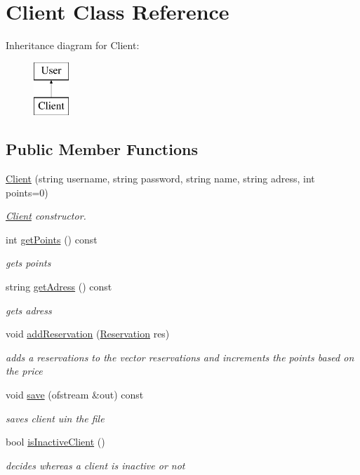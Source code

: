 \hypertarget{class_client}{}\section{Client Class Reference}
\label{class_client}
Inheritance diagram for Client\+:\begin{figure}[H]
\begin{center}
\leavevmode
\includegraphics[height=2.000000cm]{class_client}
\end{center}
\end{figure}
\subsection*{Public Member Functions}
\begin{DoxyCompactItemize}
\item 
\hyperlink{class_client_a2fb33eedfd4dca986c49b0b2660eee72}{Client} (string username, string password, string name, string adress, int points=0)
\begin{DoxyCompactList}\small\item\em \hyperlink{class_client}{Client} constructor. \end{DoxyCompactList}\item 
int \hyperlink{class_client_aa3824f589da51dc537ccab1bcfcc8e85}{get\+Points} () const
\begin{DoxyCompactList}\small\item\em gets points \end{DoxyCompactList}\item 
string \hyperlink{class_client_aa862036fb46de26f7e4e6991adb9b2dc}{get\+Adress} () const
\begin{DoxyCompactList}\small\item\em gets adress \end{DoxyCompactList}\item 
void \hyperlink{class_client_a029f358b9ebb7afbf7ae30e076243b53}{add\+Reservation} (\hyperlink{class_reservation}{Reservation} res)
\begin{DoxyCompactList}\small\item\em adds a reservations to the vector reservations and increments the points based on the price \end{DoxyCompactList}\item 
void \hyperlink{class_client_a2a03ca4558efd182ea5d76dfcec24ecb}{save} (ofstream \&out) const
\begin{DoxyCompactList}\small\item\em saves client uin the file \end{DoxyCompactList}\item 
bool \hyperlink{class_client_ad86cb579332bc44345392cdc97787845}{is\+Inactive\+Client} ()
\begin{DoxyCompactList}\small\item\em decides whereas a client is inactive or not \end{DoxyCompactList}\end{DoxyCompactItemize}
